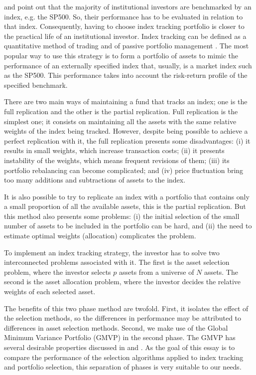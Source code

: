 \documentclass[12pt,oneside,a4paper]{memoir}
\begin{document}
 and  point out that the majority of institutional investors are benchmarked by an index, e.g. the SP500.
So, their performance has to be evaluated in relation to that index.
Consequently, having to choose index tracking portfolio is closer to the practical life of an institutional investor.
Index tracking can be defined as a quantitative method of trading and of passive portfolio management \cite{PLS10, nnl14}.
The most popular way to use this strategy is to form a portfolio of assets to mimic the performance of an externally specified index that, usually, is a market index such as the SP500.
This performance takes into account the risk-return profile of the specified benchmark.

There are two main ways of maintaining a fund that tracks an index; one is the full replication and the other is the partial replication.
Full replication is the simplest one; it consists on maintaining all the assets with the same relative weights of the index being tracked.
However, despite being possible to achieve a perfect replication with it, the full replication presents some disadvantages:
(i) it results in small weights, which increase transaction costs;
(ii) it presents instability of the weights, which means frequent revisions of them;
(iii) its portfolio rebalancing can become complicated; 
and (iv) price fluctuation bring too many additions and subtractions of assets to the index.

It is also possible to try to replicate an index with a portfolio that contains only a small proportion of all the available assets, this is the partial replication.
But this method also presents some problems:
(i) the initial selection of the small number of assets to be included in the portfolio can be hard, and
(ii) the need to estimate optimal weights (allocation) complicates the problem.

To implement an index tracking strategy, the investor has to solve two interconnected problems associated with it.
The first is the asset selection problem, where the investor selects $p$ assets from a universe of $N$ assets.
The second is the asset allocation problem, where the investor decides the relative weights of each selected asset.

The benefits of this two phase method are twofold.
First, it isolates the effect of the selection methods, so the differences in performance may be attributed to differences in asset selection methods.
Second, we make use of the Global Minimum Variance Portfolio (GMVP) in the second phase.
The GMVP has several desirable properties discussed in  and .
As the goal of this essay is to compare the performance of the selection algorithms applied to index tracking and portfolio selection, this separation of phases is very suitable to our needs.
\end{document}
